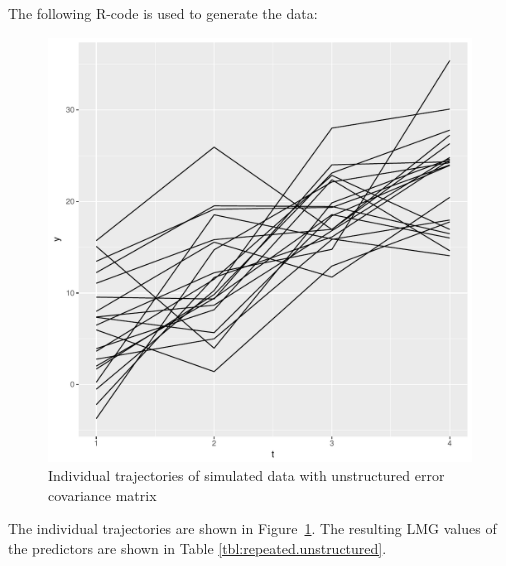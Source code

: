 \documentclass[11pt,a4paper,twoside]{book}
\makeatletter
\def\maxwidth{ %
  \ifdim\Gin@nat@width>\linewidth
    \linewidth
  \else
    \Gin@nat@width
  \fi
}
\newenvironment{knitrout}{}{} %
\makeatother
\begin{document}
The following R-code is used to generate the data:



\begin{knitrout}
\color{fgcolor}\begin{figure}
\includegraphics[width=\maxwidth]{figure/ch04_figsimdata_repeated_unstruct_plot-1} \caption[Individual trajectories of simulated data with unstructured error covariance matrix]{Individual trajectories of simulated data with unstructured error covariance matrix}\label{fig:simdata.repeated.unstruct.plot}
\end{figure}


\end{knitrout}




The individual trajectories are shown in Figure~\ref{fig:simdata.repeated.unstruct.plot}. The resulting LMG values of the predictors are shown in Table \ref{tbl:repeated.unstructured}.
\end{document}
